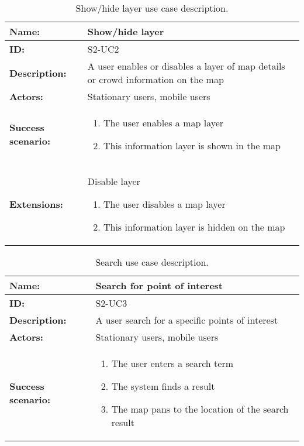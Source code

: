 \begin{table}[h!]
    \centering
    \begin{tabularx}{\textwidth}{|l|X|}
        \hline
        \textbf{Name:}  & Show/hide layer \\ \hline
        \textbf{ID:}    & S2-UC2 \\ \hline
        \textbf{Description:} & A user enables or disables a layer of map details or crowd information on the map \\ \hline
        \textbf{Actors:} & Stationary users, mobile users \\ \hline
        \textbf{Success scenario:} & 
        \begin{enumerate}
            \item The user enables a map layer
            \item This information layer is shown in the map
        \end{enumerate}
        \\ \hline
        \textbf{Extensions:} & Disable layer \newline
        \begin{enumerate}
            \item The user disables a map layer
            \item This information layer is hidden on the map
        \end{enumerate}
        \\ \hline
    \end{tabularx}
    \caption{Show/hide layer use case description.}
    \label{tab:s2-uc2}
\end{table}

\begin{table}[h!]
    \centering
    \begin{tabularx}{\textwidth}{|l|X|}
        \hline
        \textbf{Name:}  & Search for point of interest \\ \hline
        \textbf{ID:}    & S2-UC3 \\ \hline
        \textbf{Description:} & A user search for a specific points of interest \\ \hline
        \textbf{Actors:} & Stationary users, mobile users \\ \hline
        \textbf{Success scenario:} & 
        \begin{enumerate}
            \item The user enters a search term
            \item The system finds a result
            \item The map pans to the location of the search result
        \end{enumerate}
        \\ \hline
    \end{tabularx}
    \caption{Search use case description.}
    \label{tab:s2-uc3}
\end{table}

